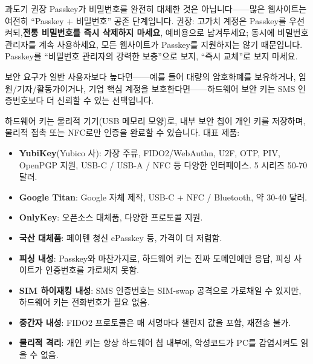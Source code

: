 \begin{tcbwarn}{과도기 권장}
Passkey가 비밀번호를 완전히 대체한 것은 아닙니다——많은 웹사이트는 여전히 “Passkey + 비밀번호” 공존 단계입니다. 권장: 고가치 계정은 Passkey를 우선 켜되,\textbf{전통 비밀번호를 즉시 삭제하지 마세요}, 예비용으로 남겨두세요; 동시에 비밀번호 관리자를 계속 사용하세요, 모든 웹사이트가 Passkey를 지원하지는 않기 때문입니다. Passkey를 “비밀번호 관리자의 강력한 보충”으로 보지, “즉시 교체”로 보지 마세요.

\end{tcbwarn}


보안 요구가 일반 사용자보다 높다면——예를 들어 대량의 암호화폐를 보유하거나, 임원/기자/활동가이거나, 기업 핵심 계정을 보호한다면——하드웨어 보안 키는 SMS 인증번호보다 더 신뢰할 수 있는 선택입니다.


하드웨어 키는 물리적 기기(USB 메모리 모양)로, 내부 보안 칩이 개인 키를 저장하며, 물리적 접촉 또는 NFC로만 인증을 완료할 수 있습니다. 대표 제품:

\begin{itemize}
  \item \textbf{YubiKey}(Yubico 사): 가장 주류, FIDO2/WebAuthn, U2F, OTP, PIV, OpenPGP 지원, USB-C / USB-A / NFC 등 다양한 인터페이스. 5 시리즈 50-70 달러.
  \item \textbf{Google Titan}: Google 자체 제작, USB-C + NFC / Bluetooth, 약 30-40 달러.
  \item \textbf{OnlyKey}: 오픈소스 대체품, 다양한 프로토콜 지원.
  \item \textbf{국산 대체품}: 페이톈 청신 ePasskey 등, 가격이 더 저렴함.
\end{itemize}


\begin{itemize}
  \item \textbf{피싱 내성}: Passkey와 마찬가지로, 하드웨어 키는 진짜 도메인에만 응답, 피싱 사이트가 인증번호를 가로채지 못함.
  \item \textbf{SIM 하이재킹 내성}: SMS 인증번호는 SIM-swap 공격으로 가로채일 수 있지만, 하드웨어 키는 전화번호가 필요 없음.
  \item \textbf{중간자 내성}: FIDO2 프로토콜은 매 서명마다 챌린지 값을 포함, 재전송 불가.
  \item \textbf{물리적 격리}: 개인 키는 항상 하드웨어 칩 내부에, 악성코드가 PC를 감염시켜도 읽을 수 없음.
\end{itemize}

